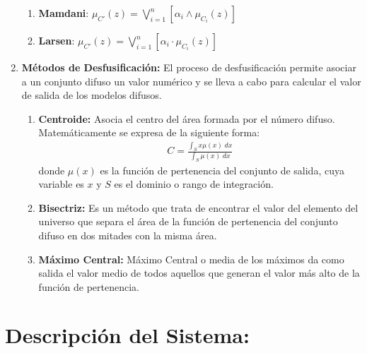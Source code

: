 \documentclass[10pt,letterpaper]{article}
\begin{document}
\begin{enumerate}
	\begin{enumerate}
		\item[] \textbf{Mamdani}: $\mu_{C'} (z) = \bigvee_{i=1}^{n} \left[ \alpha_i  \wedge \mu_{C_i} (z) \right]$ 
		
		\item[] \textbf{Larsen}: $\mu_{C'} (z) = \bigvee_{i=1}^{n} \left[ \alpha_i \cdot \mu_{C_i} (z) \right]$\\
	\end{enumerate}


\item \textbf{Métodos de Desfusificación:}
El proceso de desfusificación permite asociar a un conjunto difuso un valor numérico y se lleva a cabo para calcular el valor de salida de los modelos difusos.

	\begin{enumerate}
		\item[] \textbf{Centroide:} Asocia el centro del área formada por el número difuso. Matemáticamente se expresa de la siguiente forma:
		\begin{align*}
		C = \frac{ \int_{S} x\mu (x) \;dx }{ \int_{S} \mu (x) \;dx }  
		\end{align*}
		donde $\mu(x)$ es la función de pertenencia del conjunto de salida, cuya variable es $x$ y $S$ es el dominio o rango de integración.\\
		
		\item[] \textbf{Bisectriz:} Es un método que trata de encontrar el valor del elemento del universo que separa el área de la función de pertenencia del conjunto difuso en dos mitades con la misma área.\\
		
		\item[] \textbf{Máximo Central:} Máximo Central o media de los máximos da como salida el valor medio de todos aquellos que generan el valor más alto de la función de pertenencia.
	\end{enumerate}

\end{enumerate}


\section{Descripción del Sistema:}
\end{document}
